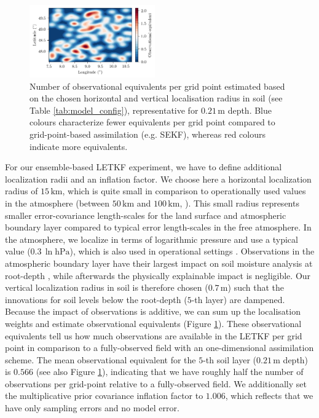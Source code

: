\documentclass[hess, manuscript]{copernicus}
\begin{document}
\begin{figure}
	\includegraphics[width=0.48\textwidth]{figures/fig_01_obs_equivalent.png}
	\caption{
		Number of observational equivalents per grid point estimated based on the chosen horizontal and vertical localisation radius in soil (see Table \ref{tab:model_config}), representative for $0.21\,\text{m}$ depth.
		Blue colours characterize fewer equivalents per grid point compared to grid-point-based assimilation (e.g. SEKF), whereas red colours indicate more equivalents.
	}
	\label{fig:obs_equivalent}
\end{figure}

For our ensemble-based LETKF experiment, we have to define additional localization radii and an inflation factor.
We choose here a horizontal localization radius of $15\,\text{km}$, which is quite small in comparison to operationally used values in the atmosphere (between $50\,\text{km}$ and $100\,\text{km}$, \citealt{schraff_kilometre-scale_2016}).
This small radius represents smaller error-covariance length-scales for the land surface and atmospheric boundary layer compared to typical error length-scales in the free atmosphere.
In the atmosphere, we localize in terms of logarithmic pressure and use a typical value ($0.3\,\ln\text{hPa}$), which is also used in operational settings \citep{schraff_kilometre-scale_2016}.
Observations in the atmospheric boundary layer have their largest impact on soil moisture analysis at root-depth \citep{munozsabater_assimilation_2019}, while afterwards the physically explainable impact is negligible.
Our vertical localization radius in soil is therefore chosen ($0.7\,\text{m}$) such that the innovations for soil levels below the root-depth ($5$-th layer) are dampened.
Because the impact of observations is additive, we can sum up the localisation weights and estimate observational equivalents (Figure \ref{fig:obs_equivalent}).
These observational equivalents tell us how much observations are available in the LETKF per grid point in comparison to a fully-observed field with an one-dimensional assimilation scheme.
The mean observational equivalent for the $5$-th soil layer ($0.21\,\text{m}$ depth) is $0.566$ (see also Figure \ref{fig:obs_equivalent}), indicating that we have roughly half the number of observations per grid-point relative to a fully-observed field.
We additionally set the multiplicative prior covariance inflation factor to $1.006$, which reflects that we have only sampling errors and no model error.
\end{document}
